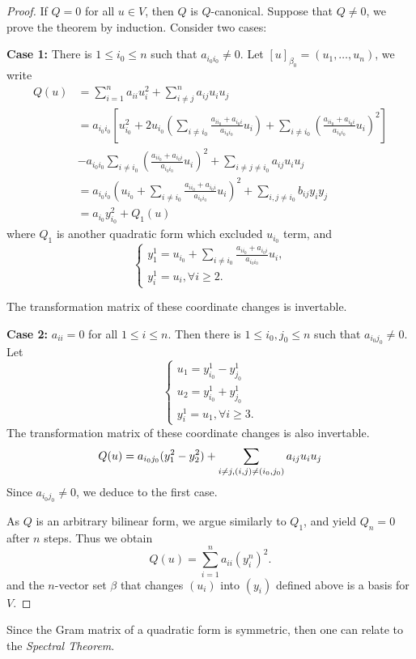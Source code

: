 ﻿\documentclass[12pt]{article}
\begin{document}
\begin{proof}
If $Q = 0$ for all $u \in V$, then $Q$ is $Q$-canonical. Suppose that $Q \neq 0$, we prove the theorem by induction. Consider two cases:

    \textbf{Case 1:} There is $1 \leq i_0 \leq n$ such that $a_{i_0 i_0} \neq 0$. Let $[u]_{\beta_0} = (u_1,\dots,u_n)$, we write 
    \begin{align*}
        Q(u) &= \sum_{i = 1}^n a_{ii}u^2_i + \sum_{i \neq j}^n a_{ij}u_iu_j\\
                &= a_{i_0i_0}\left[ u_{i_0}^2 + 2u_{i_0}\left( \sum_{i \neq i_0} \frac{a_{ii_0} + a_{i_0i}}{a_{i_0i_0}}u_i  \right)  + \sum_{i \neq i_0}\left(\frac{a_{ii_0} + a_{i_0i} }{a_{i_0i_0}} u_i\right)^2\right]\\
                &-a_{i_0i_0}\sum_{i \neq i_0}\left(\frac{a_{ii_0} + a_{i_0i} }{a_{i_0i_0}} u_i\right)^2 + \sum_{i \neq j \neq i_0}a_{ij}u_iu_j\\
                &= a_{i_0i_0}\left(u_{i_0} + \sum_{i \neq i_0} \frac{a_{ii_0} + a_{i_0i}}{a_{i_0i_0}}u_i \right)^2 + \sum_{i , j \neq i_0 }b_{ij}y_iy_j\\
                &= a_{i_0}y_{i_0}^2 + Q_1(u)
    \end{align*}
    where $Q_1$ is another quadratic form which excluded $u_{i_0}$ term, and 
    \[
    \begin{cases}
        y^1_{1} = u_{i_0} + \sum_{i \neq i_0} \frac{a_{ii_0} + a_{i_0i}}{a_{i_0i_0}}u_i,\\
        y^1_i = u_i, \forall i \geq 2.
    \end{cases}
    \]
  
The transformation matrix of these coordinate changes is invertable. 

\textbf{Case 2:} $a_{ii} = 0$ for all $1 \leq i \leq n$. Then there is $1 \leq i_0,j_0 \leq n$ such that $a_{i_0j_0} \neq 0$. Let 
\[
    \begin{cases}
        u_{1} = y^1_{i_0} - y^1_{j_0}\\
        u_{2} = y^1_{i_0} + y^1_{j_0}\\
        y^1_i = u_1, \forall i \geq 3.
    \end{cases} 
\]
The transformation matrix of these coordinate changes is also invertable.
\[
    Q(u) = a_{i_0j_0}(y_{1}^2 - y^2_{2}) + \sum_{i \neq j,\\(i,j)\neq(i_0,j_0)} a_{ij}u_iu_j 
\]
Since $a_{i_0j_0} \neq 0$, we deduce to the first case.

As $Q$ is an arbitrary bilinear form, we argue similarly to $Q_1$, and yield $Q_{n} = 0$ after $n$ steps. Thus we obtain
\[
    Q(u) = \sum_{i = 1}^n a_{ii}(y_i^n)^2.
\]
and the $n$-vector set $\beta$ that changes $(u_i)$ into $(y_i)$ defined above is a basis for $V$. 
\end{proof}
Since the Gram matrix of a quadratic form is symmetric, then one can relate to the \textit{Spectral Theorem}.
\end{document}
